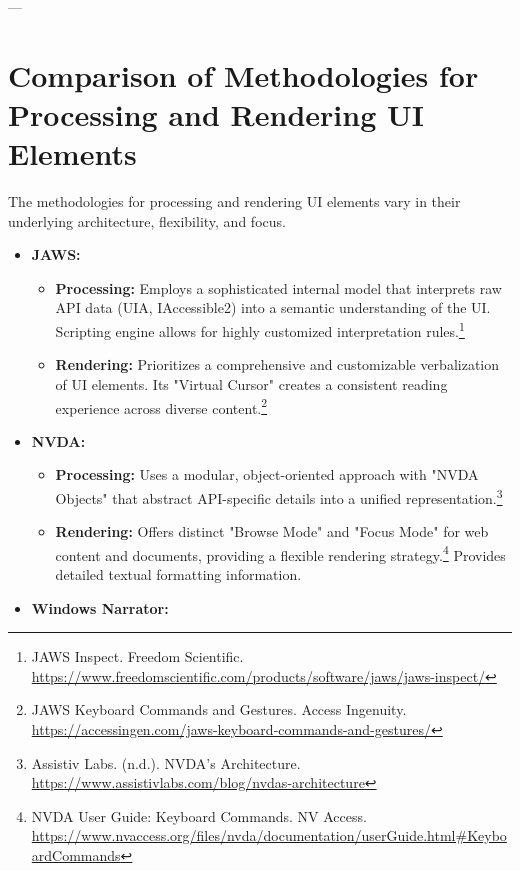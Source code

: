 ---

\section{Comparison of Methodologies for Processing and Rendering UI Elements}
\label{sec:comparison-methodologies}

The methodologies for processing and rendering UI elements vary in their underlying architecture, flexibility, and focus.

\begin{itemize}[leftmargin=*,noitemsep,topsep=0pt]
    \item \textbf{JAWS:}
    \begin{itemize}[leftmargin=*,noitemsep,topsep=0pt]
        \item \textbf{Processing:} Employs a sophisticated internal model that interprets raw API data (UIA, IAccessible2) into a semantic understanding of the UI. Scripting engine allows for highly customized interpretation rules.\footnote{JAWS Inspect. Freedom Scientific. \url{https://www.freedomscientific.com/products/software/jaws/jaws-inspect/}}
        \item \textbf{Rendering:} Prioritizes a comprehensive and customizable verbalization of UI elements. Its "Virtual Cursor" creates a consistent reading experience across diverse content.\footnote{JAWS Keyboard Commands and Gestures. Access Ingenuity. \url{https://accessingen.com/jaws-keyboard-commands-and-gestures/}}
    \end{itemize}
    \item \textbf{NVDA:}
    \begin{itemize}[leftmargin=*,noitemsep,topsep=0pt]
        \item \textbf{Processing:} Uses a modular, object-oriented approach with "NVDA Objects" that abstract API-specific details into a unified representation.\footnote{Assistiv Labs. (n.d.). NVDA's Architecture. \url{https://www.assistivlabs.com/blog/nvdas-architecture}}
        \item \textbf{Rendering:} Offers distinct "Browse Mode" and "Focus Mode" for web content and documents, providing a flexible rendering strategy.\footnote{NVDA User Guide: Keyboard Commands. NV Access. \url{https://www.nvaccess.org/files/nvda/documentation/userGuide.html#KeyboardCommands}} Provides detailed textual formatting information.
    \end{itemize}
    \item \textbf{Windows Narrator:}
    \begin{itemize}[leftmargin=*,noitemsep,topsep=0pt]

\end{itemize}
\end{itemize}
